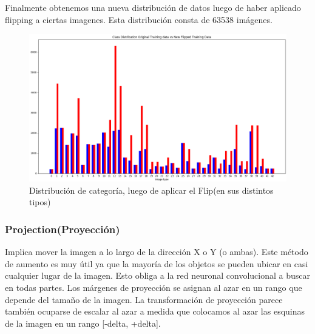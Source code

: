 	Finalmente obtenemos una nueva distribución de datos luego de haber aplicado flipping a ciertas imagenes. Esta distribución consta de 63538 imágenes.
	\begin{figure}[H]
		\begin{center}
		\includegraphics[width=1\textwidth]{images/desarrollo/histograms/train_flipped63538}
		\end{center}
		\begin{center}
		\vspace{1em}
		\caption{\small{Distribución de categoría, luego de aplicar el Flip(en sus distintos tipos)}}
		\vspace{-1em}
		{\small{\fontsize{10}{16.8}\selectfont {Fuente propia}}}
		\end{center}
		\vspace{-1.5em}
	\end{figure}


	\subsubsection{Projection(Proyección)}
		Implica mover la imagen a lo largo de la dirección X o Y (o ambas). Este método de aumento es muy útil ya que la mayoría de los objetos se pueden ubicar en casi cualquier lugar de la imagen. Esto obliga a la red neuronal convolucional a buscar en todas partes.
		Los márgenes de proyección se asignan al azar en un rango que depende del tamaño de la imagen. La transformación de proyección parece también ocuparse de escalar al azar a medida que colocamos al azar las esquinas de la imagen en un rango [-delta, +delta].

